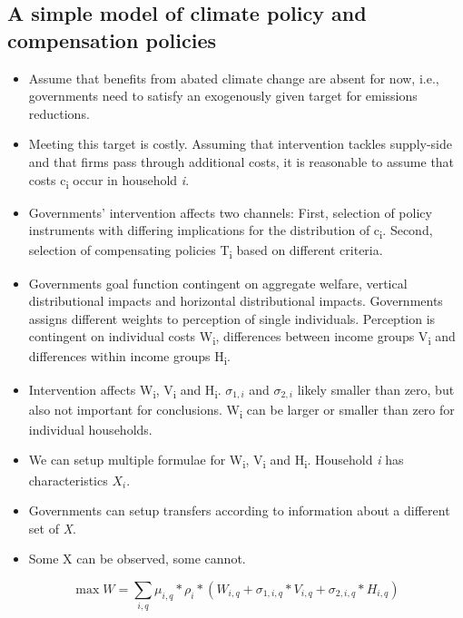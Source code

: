 \documentclass[12pt, a4paper]{article}
\begin{document}
\begin{refsection}
\subsection{A simple model of climate policy and compensation policies}

\begin{itemize}
    \item Assume that benefits from abated climate change are absent for now, i.e., governments need to satisfy an exogenously given target for emissions reductions.
    \item Meeting this target is costly. Assuming that intervention tackles supply-side and that firms pass through additional costs, it is reasonable to assume that costs c\textsubscript{i} occur in household \textit{i}.
    \item Governments' intervention affects two channels: First, selection of policy instruments with differing implications for the distribution of c\textsubscript{i}. Second, selection of compensating policies T\textsubscript{i} based on different criteria.
    \item Governments goal function contingent on aggregate welfare, vertical distributional impacts and horizontal distributional impacts. Governments assigns different weights to perception of single individuals. Perception is contingent on individual costs W\textsubscript{i}, differences between income groups V\textsubscript{i} and differences within income groups H\textsubscript{i}.
    \item Intervention affects W\textsubscript{i}, V\textsubscript{i} and H\textsubscript{i}. $\sigma_{1,i}$ and $\sigma_{2,i}$ likely smaller than zero, but also not important for conclusions. W\textsubscript{i} can be larger or smaller than zero for individual households.
    \item We can setup multiple formulae for W\textsubscript{i}, V\textsubscript{i} and H\textsubscript{i}. Household \textit{i} has characteristics $X_{i}$.
    \item Governments can setup transfers according to information about a different set of \textit{X}.
    \item Some X can be observed, some cannot.
\end{itemize}

\begin{equation}
   \max  W = \sum_{i,q} \mu_{i,q} * \rho_{i} * (W_{i,q} + \sigma_{1,i,q} * V_{i,q} + \sigma_{2,i,q} * H_{i,q})
\end{equation}


\end{refsection}
\end{document}
